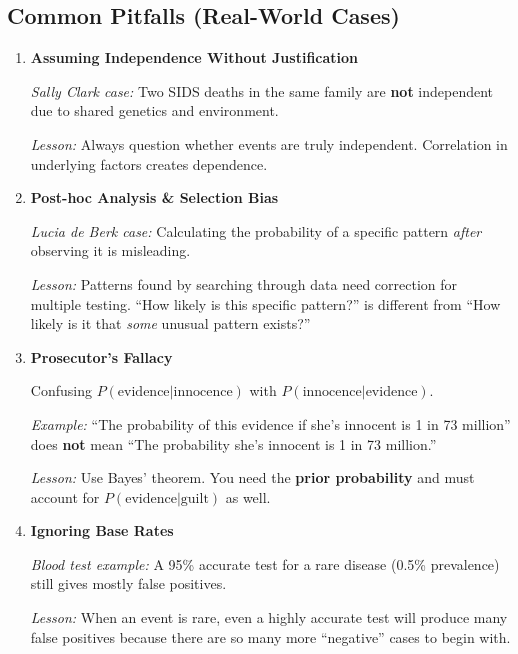 \documentclass[11pt,a4paper]{article}
\begin{document}
\subsection*{Common Pitfalls (Real-World Cases)}

\begin{enumerate}
    \item \textbf{Assuming Independence Without Justification}
    
    \textit{Sally Clark case:} Two SIDS deaths in the same family are \textbf{not} independent due to shared genetics and environment.
    
    \textit{Lesson:} Always question whether events are truly independent. Correlation in underlying factors creates dependence.
    
    \item \textbf{Post-hoc Analysis \& Selection Bias}
    
    \textit{Lucia de Berk case:} Calculating the probability of a specific pattern \textit{after} observing it is misleading.
    
    \textit{Lesson:} Patterns found by searching through data need correction for multiple testing. ``How likely is this specific pattern?'' is different from ``How likely is it that \textit{some} unusual pattern exists?''
    
    \item \textbf{Prosecutor's Fallacy}
    
    Confusing $P(\text{evidence}|\text{innocence})$ with $P(\text{innocence}|\text{evidence})$.
    
    \textit{Example:} ``The probability of this evidence if she's innocent is 1 in 73 million'' does \textbf{not} mean ``The probability she's innocent is 1 in 73 million.''
    
    \textit{Lesson:} Use Bayes' theorem. You need the \textbf{prior probability} and must account for $P(\text{evidence}|\text{guilt})$ as well.
    
    \item \textbf{Ignoring Base Rates}
    
    \textit{Blood test example:} A 95\% accurate test for a rare disease (0.5\% prevalence) still gives mostly false positives.
    
    \textit{Lesson:} When an event is rare, even a highly accurate test will produce many false positives because there are so many more ``negative'' cases to begin with.
\end{enumerate}
\end{document}
